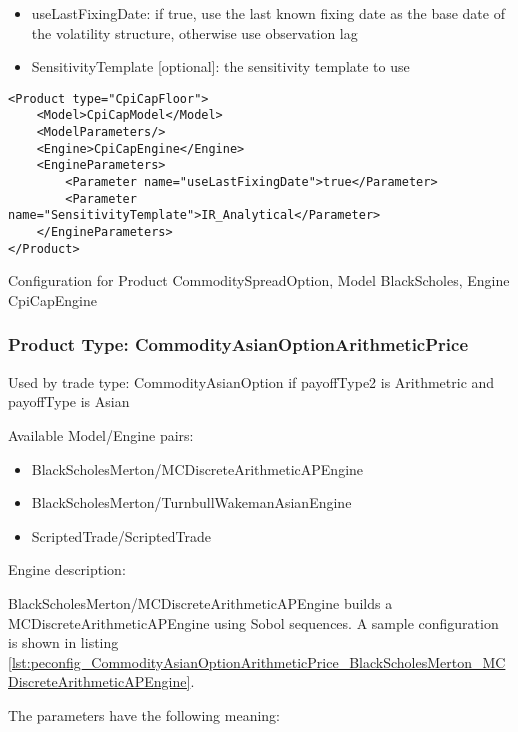 \begin{itemize}
\item useLastFixingDate: if true, use the last known fixing date as the base date of the volatility structure, otherwise
  use observation lag
\item SensitivityTemplate [optional]: the sensitivity template to use 
\end{itemize}

\begin{longlisting}
\begin{verbatim}
<Product type="CpiCapFloor">
    <Model>CpiCapModel</Model>
    <ModelParameters/>
    <Engine>CpiCapEngine</Engine>
    <EngineParameters>
        <Parameter name="useLastFixingDate">true</Parameter>
        <Parameter name="SensitivityTemplate">IR_Analytical</Parameter>
    </EngineParameters>
</Product>
\end{verbatim}
\caption{Configuration for Product CommoditySpreadOption, Model BlackScholes, Engine CpiCapEngine}
\label{lst:peconfig_CpiCapFloor_CpiCapModel_CpiCapEngine}
\end{longlisting}

\subsubsection{Product Type: CommodityAsianOptionArithmeticPrice}

Used by trade type: CommodityAsianOption if payoffType2 is Arithmetric and payoffType is Asian

Available Model/Engine pairs:

\begin{itemize}
  \item BlackScholesMerton/MCDiscreteArithmeticAPEngine
  \item BlackScholesMerton/TurnbullWakemanAsianEngine
  \item ScriptedTrade/ScriptedTrade
\end{itemize}

Engine description:

BlackScholesMerton/MCDiscreteArithmeticAPEngine builds a MCDiscreteArithmeticAPEngine using Sobol sequences. A sample
configuration is shown in listing
\ref{lst:peconfig_CommodityAsianOptionArithmeticPrice_BlackScholesMerton_MCDiscreteArithmeticAPEngine}.

The parameters have the following meaning:

